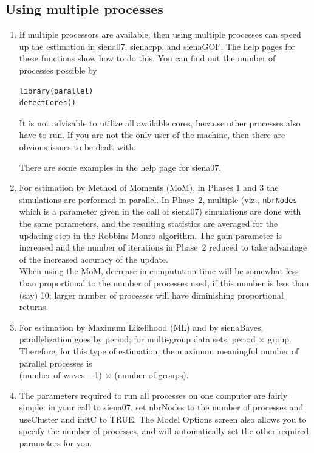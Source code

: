 \documentclass[a4paper,fleqn,11pt]{article}
\newcommand{\+}{\, + \,}
\newcommand{\sfn}[1]{\textsf{#1}}
\begin{document}
\subsection{Using multiple processes}
\label{S_multipleProcesses}
\begin{enumerate}
\item
  If multiple processors are available, then using
  multiple processes can speed up the estimation in \textsf{siena07},
  \sfn{sienacpp}, and \textsf{sienaGOF}.
  The help pages for these functions show how to do this.
  You can find out the number of processes possible by
\begin{verbatim}
library(parallel)
detectCores()
\end{verbatim}
  It is not advisable to utilize all available cores, because
  other processes also have to run. If you are not the only user
  of the machine, then there are obvious issues to be dealt with.

  There are some examples in the help page for \textsf{siena07}.
\item For estimation by Method of Moments (MoM), in Phases 1 and 3
  the simulations are performed in parallel. In Phase~2,
  multiple (viz., \texttt{nbrNodes} which is a parameter
  given in the call of \sfn{siena07}) simulations are done with the same parameters,
  and the resulting statistics are averaged for the updating step in the
  Robbins Monro algorithm. The gain parameter is increased and the
  number of iterations in Phase~2 reduced to take advantage of
  the increased accuracy of the update.\\
  When using the MoM, decrease in computation time will be somewhat less
  than proportional to the number of processes used, if this number is less than
  (say) 10; larger number of processes will have diminishing proportional
  returns.

\item For estimation by Maximum Likelihood (ML) and by \sfn{sienaBayes},
  parallelization goes by period; for multi-group data sets, period $\times$
  group. Therefore, for this type of estimation, the maximum meaningful number
  of parallel processes is \\ (number of waves -- 1) $\times$ (number of groups).

\item The parameters required to run all processes on one computer are fairly
  simple: in your call to \textsf{siena07}, set \sfn{nbrNodes} to the number of
  processes and \sfn{useCluster} and \sfn{initC} to TRUE. The \sfn{Model
    Options} screen also allows you to specify the number of processes, and
  will automatically set the other required parameters for you.


\end{enumerate}
\end{document}
